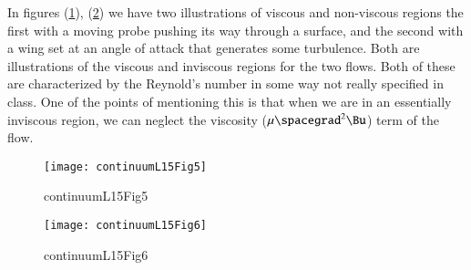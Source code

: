 In figures (\ref{fig:continuumL15:continuumL15Fig5}), (\ref{fig:continuumL15:continuumL15Fig6}) we have two illustrations of viscous and non-viscous regions the first with a moving probe pushing its way through a surface, and the second with a wing set at an angle of attack that generates some turbulence.  Both are illustrations of the viscous and inviscous regions for the two flows.  Both of these are characterized by the Reynold's number in some way not really specified in class.  One of the points of mentioning this is that when we are in an essentially inviscous region, we can neglect the viscosity ($\mu \spacegrad^2 \Bu$) term of the flow.
\begin{figure}[htp]
   \centering
   \texttt{[image: continuumL15Fig5]}
   \caption{continuumL15Fig5}\label{fig:continuumL15:continuumL15Fig5}
\end{figure}
\begin{figure}[htp]
   \centering
   \texttt{[image: continuumL15Fig6]}
   \caption{continuumL15Fig6}\label{fig:continuumL15:continuumL15Fig6}
\end{figure}


\EndArticle
